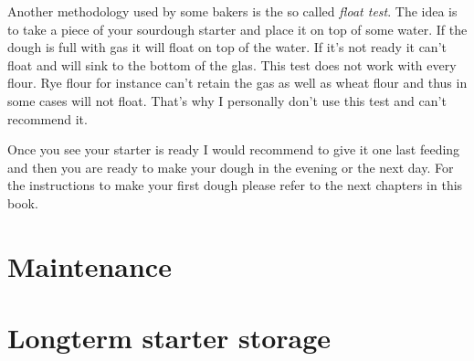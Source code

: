 Another methodology used by some bakers is the so called \emph{float test}.
The idea is to take a piece of your sourdough starter and place it
on top of some water. If the dough is full with gas it will float
on top of the water. If it's not ready it can't float and will
sink to the bottom of the glas. This test does not work with every flour.
Rye flour for instance can't retain the gas as well as wheat flour
and thus in some cases will not float. That's why I personally
don't use this test and can't recommend it.

Once you see your starter is ready I would recommend to give it
one last feeding and then you are ready to make your dough in the
evening or the next day. For the instructions to make your
first dough please refer to the next chapters in this book.

\section{Maintenance}
\section{Longterm starter storage}
